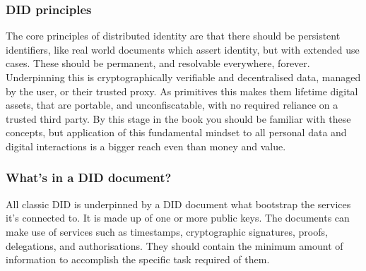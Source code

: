 \subsubsection{DID principles}
The core principles of distributed identity are that there should be persistent identifiers, like real world documents which assert identity, but with extended use cases. These should be permanent, and resolvable everywhere, forever. Underpinning this is cryptographically verifiable and decentralised data, managed by the user, or their trusted proxy. As primitives this makes them lifetime digital assets, that are portable, and unconfiscatable, with no required reliance on a trusted third party. By this stage in the book you should be familiar with these concepts, but application of this fundamental mindset to all personal data and digital interactions is a bigger reach even than money and value.
\subsubsection{What's in a DID document?}
All classic DID is underpinned by a DID document what bootstrap the services it's connected to. It is made up of one or more public keys. The documents can make use of services such as timestamps, cryptographic signatures, proofs, delegations, and authorisations. They should contain the minimum amount of information to accomplish the specific task required of them.

